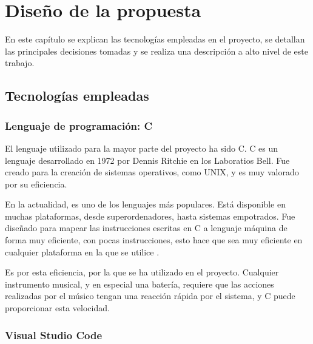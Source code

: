 
\chapter{Diseño de la propuesta} %
\label{cha:Diseno}

    En este capítulo se explican las tecnologías empleadas en el proyecto, se detallan las principales decisiones
    tomadas y se realiza una descripción a alto nivel de este trabajo.

    \section{Tecnologías empleadas} %
    \label{sec:TecnologiasEmpleadas}

        \subsection{Lenguaje de programación: C} %
        \label{sub:CLanguage}

            El lenguaje utilizado para la mayor parte del proyecto ha sido C. C es un lenguaje desarrollado en 1972 por
            Dennis Ritchie en los Laboratios Bell. Fue creado para la creación de sistemas operativos, como UNIX, y es
            muy valorado por su eficiencia.

            En la actualidad, es uno de los lenguajes más populares. Está disponible en muchas plataformas, desde
            superordenadores, hasta sistemas empotrados. Fue diseñado para mapear las instrucciones escritas en C a
            lenguaje máquina de forma muy eficiente, con pocas instrucciones, esto hace que sea muy eficiente en
            cualquier plataforma en la que se utilice \cite{wikipedia_c_language}.

            Es por esta eficiencia, por la que se ha utilizado en el proyecto. Cualquier instrumento musical, y en
            especial una batería, requiere que las acciones realizadas por el músico tengan una reacción rápida por el
            sistema, y C puede proporcionar esta velocidad.


        \subsection{Visual Studio Code} %
        \label{sub:VisualStudioCode}

